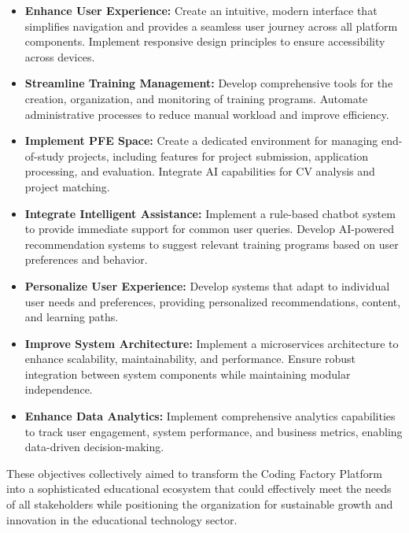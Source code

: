 \documentclass[12pt,a4paper]{report}
\begin{document}
\begin{itemize}
    \item \textbf{Enhance User Experience:} Create an intuitive, modern interface that simplifies navigation and provides a seamless user journey across all platform components. Implement responsive design principles to ensure accessibility across devices.

    \item \textbf{Streamline Training Management:} Develop comprehensive tools for the creation, organization, and monitoring of training programs. Automate administrative processes to reduce manual workload and improve efficiency.

    \item \textbf{Implement PFE Space:} Create a dedicated environment for managing end-of-study projects, including features for project submission, application processing, and evaluation. Integrate AI capabilities for CV analysis and project matching.

    \item \textbf{Integrate Intelligent Assistance:} Implement a rule-based chatbot system to provide immediate support for common user queries. Develop AI-powered recommendation systems to suggest relevant training programs based on user preferences and behavior.

    \item \textbf{Personalize User Experience:} Develop systems that adapt to individual user needs and preferences, providing personalized recommendations, content, and learning paths.

    \item \textbf{Improve System Architecture:} Implement a microservices architecture to enhance scalability, maintainability, and performance. Ensure robust integration between system components while maintaining modular independence.

    \item \textbf{Enhance Data Analytics:} Implement comprehensive analytics capabilities to track user engagement, system performance, and business metrics, enabling data-driven decision-making.
\end{itemize}

These objectives collectively aimed to transform the Coding Factory Platform into a sophisticated educational ecosystem that could effectively meet the needs of all stakeholders while positioning the organization for sustainable growth and innovation in the educational technology sector.
\end{document}
